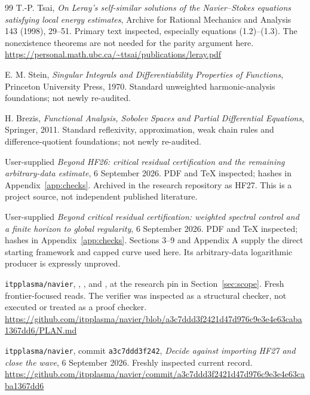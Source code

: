 \documentclass[11pt,a4paper]{article}
\theoremstyle{definition}\newtheorem{definition}[theorem]{Definition}
\theoremstyle{remark}\newtheorem{remark}[theorem]{Remark}
\numberwithin{equation}{section}
\begin{document}
\begin{thebibliography}{99}
 T.-P. Tsai, \emph{On Leray's self-similar solutions of the Navier--Stokes equations satisfying local energy estimates}, Archive for Rational Mechanics and Analysis 143 (1998), 29--51. Primary text inspected, especially equations (1.2)--(1.3). The nonexistence theorems are not needed for the parity argument here.\newline
\url{https://personal.math.ubc.ca/~ttsai/publications/leray.pdf}

 E. M. Stein, \emph{Singular Integrals and Differentiability Properties of Functions}, Princeton University Press, 1970. Standard unweighted harmonic-analysis foundations; not newly re-audited.

 H. Brezis, \emph{Functional Analysis, Sobolev Spaces and Partial Differential Equations}, Springer, 2011. Standard reflexivity, approximation, weak chain rules and difference-quotient foundations; not newly re-audited.

 User-supplied \emph{Beyond HF26: critical residual certification and the remaining arbitrary-data estimate}, 6 September 2026. PDF and TeX inspected; hashes in Appendix~\ref{app:checks}. Archived in the research repository as HF27. This is a project source, not independent published literature.

 User-supplied \emph{Beyond critical residual certification: weighted spectral control and a finite horizon to global regularity}, 6 September 2026. PDF and TeX inspected; hashes in Appendix~\ref{app:checks}. Sections 3--9 and Appendix A supply the direct starting framework and capped curve used here. Its arbitrary-data logarithmic producer is expressly unproved.

 \texttt{itpplasma/navier}, , ,  and , at the research pin in Section~\ref{sec:scope}. Fresh frontier-focused reads. The verifier was inspected as a structural checker, not executed or treated as a proof checker.\newline
\url{https://github.com/itpplasma/navier/blob/a3c7ddd3f2421d47d976c9e3e4e63caba1367dd6/PLAN.md}

 \texttt{itpplasma/navier}, commit \texttt{a3c7ddd3f242}, \emph{Decide against importing HF27 and close the wave}, 6 September 2026. Freshly inspected current record.\newline
\url{https://github.com/itpplasma/navier/commit/a3c7ddd3f2421d47d976c9e3e4e63caba1367dd6}


\end{thebibliography}
\end{document}
